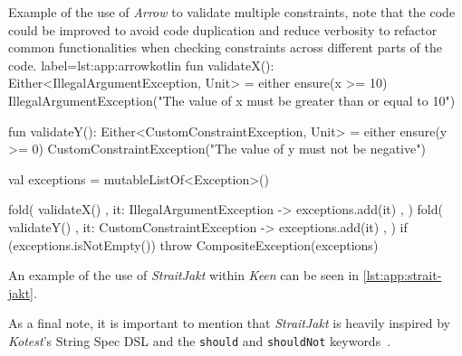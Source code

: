         \begin{code}{
            Example of the use of \textit{Arrow} to validate multiple constraints, note that the code could be improved
            to avoid code duplication and reduce verbosity to refactor common functionalities when checking constraints
            across different parts of the code.
        }{label=lst:app:arrow}{kotlin}
            fun validateX(): Either<IllegalArgumentException, Unit> = either {
                ensure(x >= 10) { IllegalArgumentException("The value of x must be greater than or equal to 10") }
            }

            fun validateY(): Either<CustomConstraintException, Unit> = either {
                ensure(y >= 0) { CustomConstraintException("The value of y must not be negative") }
            }

            val exceptions = mutableListOf<Exception>()

            fold(
                { validateX() },
                { it: IllegalArgumentException -> exceptions.add(it) },
                {}
            )
            fold(
                { validateY() },
                { it: CustomConstraintException -> exceptions.add(it) },
                {}
            )
            if (exceptions.isNotEmpty()) {
                throw CompositeException(exceptions)
            }
        \end{code}

        An example of the use of \textit{StraitJakt} within \textit{Keen} can be seen in \vref{lst:app:strait-jakt}.
        
        As a final note, it is important to mention that \textit{StraitJakt} is heavily inspired by \textit{Kotest}'s
        String Spec DSL and the \texttt{should} and \texttt{shouldNot} keywords~\autocite{KotestKotesta}.
    